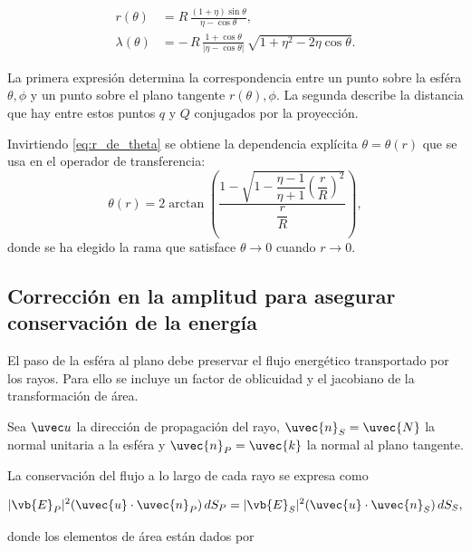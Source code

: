 \begin{align}
r(\theta) &= R\,\frac{(1+\eta)\sin\theta}{\eta - \cos\theta}, 
\label{eq:r_de_theta}\\[6pt]
\lambda(\theta) &= -\,R\,\frac{1+\cos\theta}{|\eta-\cos\theta|}
\,\sqrt{1+\eta^2 - 2\eta\cos\theta}.
\label{eq:lambda_de_theta}
\end{align}

La primera expresión determina la correspondencia entre un punto sobre la esféra \(\theta, \phi \) y un punto sobre el plano tangente \(r(\theta), \phi\).  
La segunda describe la distancia que hay entre estos puntos $q$ y $Q$ conjugados por la proyección.  

Invirtiendo \eqref{eq:r_de_theta} se obtiene la dependencia explícita \(\theta = \theta(r)\) que se usa en el operador de transferencia:
\begin{equation}
    \theta(r)
    =
    2 \arctan\!\left(
    \frac{
        1 - \sqrt{1 - \dfrac{\eta-1}{\eta+1}\left(\dfrac{r}{R}\right)^2}
    }{\dfrac{r}{R}}
    \right),
    \label{eq:theta_de_r}
\end{equation}
donde se ha elegido la rama que satisface $\theta \to 0$ cuando $r \to 0$.

\vspace{0.5em}

\subsection{Corrección en la amplitud para asegurar conservación de la energía}
\label{subsec:correccion_amplitud}

El paso de la esféra al plano debe preservar el flujo energético transportado por los rayos. Para ello se incluye un factor de oblicuidad y el jacobiano de la transformación de área.  

Sea $\uvec u$ la dirección de propagación del rayo, $\uvec{n}_S = \uvec{N}$ la normal unitaria a la esféra y $\uvec{n}_P = \uvec{k}$ la normal al plano tangente.

La conservación del flujo a lo largo de cada rayo se expresa como

\begin{equation}
|\vb{E}_P|^2 (\uvec{u}\cdot\uvec{n}_P)\, dS_P
=
|\vb{E}_S|^2 (\uvec{u}\cdot\uvec{n}_S)\, dS_S,
\label{eq:flux_conservation_sphere}
\end{equation}

donde los elementos de área están dados por

